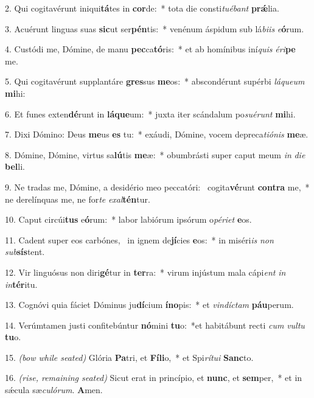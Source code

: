 2. Qui cogitavérunt iniqui\textbf{tá}tes in \textbf{cor}de:~* tota die consti\textit{tu}\textit{é}\textit{bant} \textbf{pr\'{\ae}}lia.

3. Acuérunt linguas suas \textbf{sic}ut ser\textbf{pén}tis:~* venénum áspidum sub lá\textit{bi}\textit{is} \textit{e}\textbf{ó}rum.

4. Custódi me, Dómine, de manu \textbf{pec}ca\textbf{tó}ris:~* et ab homínibus iní\textit{quis} \textit{é}\textit{ri}\textbf{pe} me.

5. Qui cogitavérunt supplantáre \textbf{gres}sus \textbf{me}os:~* abscondérunt supérbi \textit{lá}\textit{que}\textit{um} \textbf{mi}hi:

6. Et funes exten\textbf{dé}runt in \textbf{lá}\textbf{que}um:~* juxta iter scándalum po\textit{su}\textit{é}\textit{runt} \textbf{mi}hi.

7. Dixi Dómino: Deus \textbf{me}us \textbf{es} tu:~* exáudi, Dómine, vocem depreca\textit{ti}\textit{ó}\textit{nis} \textbf{me}æ.

8. Dómine, Dómine, virtus sa\textbf{lú}tis \textbf{me}æ:~* obumbrásti super caput meum \textit{in} \textit{di}\textit{e} \textbf{bel}li.

9. Ne tradas me, Dómine, a desidério meo peccatóri:~{\color{red}\GreDagger} cogita\textbf{vé}runt \textbf{con}\textbf{tra} me,~* ne derelínquas me, ne for\textit{te} \textit{ex}\textit{al}\textbf{tén}tur.

10. Caput circúi\textbf{tus} e\textbf{ó}rum:~* labor labiórum ipsórum o\textit{pé}\textit{ri}\textit{et} \textbf{e}os.

11. Cadent super eos carbónes,~{\color{red}\GreDagger} in ignem de\textbf{jí}cies \textbf{e}os:~* in miséri\textit{is} \textit{non} \textit{sub}\textbf{sís}tent.

12. Vir linguósus non diri\textbf{gé}tur in \textbf{ter}ra:~* virum injústum mala cápi\textit{ent} \textit{in} \textit{in}\textbf{tér}itu.

13. Cognóvi quia fáciet Dóminus ju\textbf{dí}cium \textbf{ín}\textbf{o}pis:~* et \textit{vin}\textit{díc}\textit{tam} \textbf{páu}perum.

14. Verúmtamen justi confitebúntur \textbf{nó}mini \textbf{tu}o:~*et habitábunt recti \textit{cum} \textit{vul}\textit{tu} \textbf{tu}o.

15. {\color{red}\textit{(bow while seated)}} Glória \textbf{Pa}tri, et \textbf{Fí}\textbf{li}o,~* et Spi\textit{rí}\textit{tu}\textit{i} \textbf{Sanc}to.

16. {\color{red}\textit{(rise, remaining seated)}} Sicut erat in princípio, et \textbf{nunc}, et \textbf{sem}per,~* et in s\'{\ae}cula sæ\textit{cu}\textit{ló}\textit{rum}. \textbf{A}men.